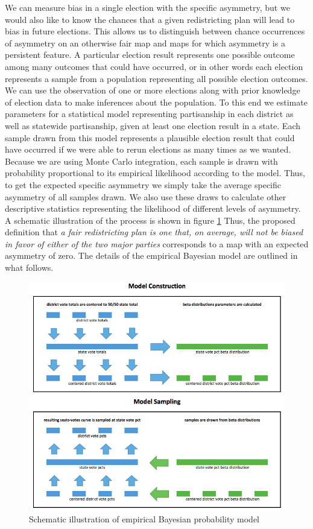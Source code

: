 \documentclass[preprint,12pt]{article}
\begin{document}
We can measure bias in a single election with the specific asymmetry, but we would also like to know the chances that a given redistricting plan will lead to bias in future elections.
This allows us to distinguish between chance occurrences of asymmetry on an otherwise fair map and maps for which asymmetry is a persistent feature.
A particular election result represents one possible outcome among many outcomes that could have occurred, or in other words each election represents a sample from a population representing all possible election outcomes.
We can use the observation of one or more elections along with prior knowledge of election data to make inferences about the population.
To this end we estimate parameters for a statistical model representing partisanship in each district as well as statewide partisanship, given at least one election result in a state.
Each sample drawn from this model represents a plausible election result that could have occurred if we were able to rerun elections as many times as we wanted.
Because we are using Monte Carlo integration, each sample is drawn with probability proportional to its empirical likelihood according to the model.
Thus, to get the expected specific asymmetry we simply take the average specific asymmetry of all samples drawn.
We also use these draws to calculate other descriptive statistics representing the likelihood of different levels of asymmetry.
A schematic illustration of the process is shown in figure \ref{fig:ProbModel}
Thus, the proposed definition that \emph{a fair redistricting plan is one that, on average, will not be biased in favor of either of the two major parties} corresponds to a map with an expected asymmetry of zero.
The details of the empirical Bayesian model are outlined in what follows.

\begin{figure}[htb!]
    \begin{center}
        \includegraphics[scale=0.6]{../Figures/Other/probability_model.png}
        \caption{Schematic illustration of empirical Bayesian probability model}\label{fig:ProbModel}
    \end{center}
\end{figure}
\end{document}

